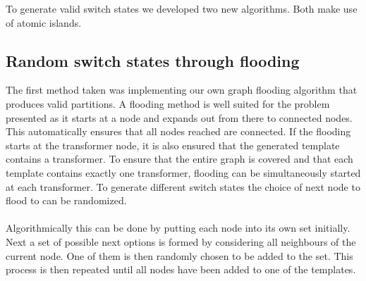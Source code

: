 To generate valid switch states we developed two new algorithms. Both make
use of atomic islands.

\subsection{Random switch states through flooding}

The first method taken was implementing our own graph flooding algorithm that
produces valid partitions. A flooding method is well suited for the problem presented
as it starts at a node and expands out from there to connected nodes. This automatically
ensures that all nodes reached are connected. If the flooding starts at the 
transformer node, it is also ensured that the generated template contains a
transformer. To ensure that the entire graph is covered and that each template contains
exactly one transformer, flooding can be simultaneously started at each transformer.
To generate different switch states the choice of next node to flood to can be
randomized.\\
\\
Algorithmically this can be done by putting each node into its
own set initially.
Next a set of possible next options is formed by considering all neighbours of the
current node. One of them is then randomly chosen to be added to the set.
This process is then repeated until
all nodes have been added to one of the templates. 

